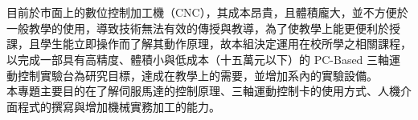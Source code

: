 \documentclass[UTF8]{ctexart}
\newcommand{\twentyfour}{\fontsize{24pt}{\baselineskip}\selectfont}%
\newcommand{\sixteen}{\fontsize{16pt}{\baselineskip}\selectfont}%
\begin{document}
    \newpage
    {\begin{center}
        \bf \kaishu \twentyfour {摘要}\\
    \end{center}}
        \kaishu \sixteen {生產自動化是現今工業界中最重要的一環，一國國力之強弱取決於工業發展的情況，而其經濟的動脈更是來自於自動化工業，故發展自動化工業技術，已是時代潮流。對於我國在踏入高科技產業的同時，如何以更低的成本與縮短生產製程，來提高在國際上的競爭力，是大家所努力的目標，而身為未來二十一世紀的一員，更需了解其重要性。}
        \kaishu \sixteen\\{目前於市面上的數位控制加工機（CNC），其成本昂貴，且體積龐大，並不方便於一般教學的使用，導致技術無法有效的傳授與教導，為了使教學上能更便利於授課，且學生能立即操作而了解其動作原理，故本組決定運用在校所學之相關課程，以完成一部具有高精度、體積小與低成本（十五萬元以下）的 PC-Based 三軸運動控制實驗台為研究目標，達成在教學上的需要，並增加系內的實驗設備。}
        \kaishu \sixteen\\{本專題主要目的在了解伺服馬達的控制原理、三軸運動控制卡的使用方式、人機介面程式的撰寫與增加機械實務加工的能力。}
        \newpage
\end{document}
